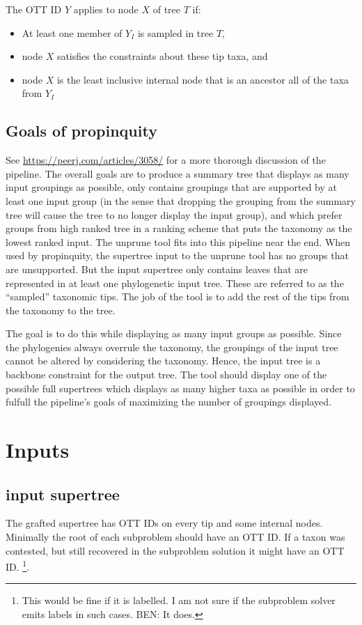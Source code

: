 \documentclass[english]{article}
\begin{document}
The OTT ID $Y$ applies to node $X$ of tree $T$ if:
\begin{itemize}
    \item At least one member of $Y_I$ is sampled in tree $T$,
    \item node $X$ satisfies the constraints about these tip taxa, and
    \item node $X$ is the least inclusive internal node that is an ancestor all of the taxa from $Y_I$
\end{itemize}

\subsection{Goals of propinquity}
See \url{https://peerj.com/articles/3058/} for a more thorough discussion of the pipeline.
The overall goals are to produce a summary tree that displays as many input groupings as
    possible, only contains groupings that are supported by at least one
    input group (in the sense that dropping the grouping from the summary tree will cause
    the tree to no longer display the input group), and which prefer groups from 
    high ranked tree in a ranking scheme that puts the taxonomy as the lowest ranked
    input.
The unprune tool fits into this pipeline near the end.
When used by propinquity, the supertree input to the unprune tool has no
    groups that are unsupported.
But the input supertree only contains leaves that are represented in at least one 
    phylogenetic input tree.
These are referred to as the ``sampled'' taxonomic tips.
The job of the tool is to add the rest of the tips from the taxonomy to the tree.

The goal is to do this while displaying as many input groups as possible.
Since the phylogenies always overrule the taxonomy, the groupings of the input
    tree cannot be altered by considering the taxonomy.
Hence, the input tree is a backbone constraint for the output tree.
The tool should display one of the possible full supertrees which displays as
    many higher taxa as possible in order to fulfull the pipeline's goals of
    maximizing the number of groupings displayed.




\section{Inputs}
\subsection{input supertree}
The grafted supertree has OTT IDs on every tip and some internal nodes.
Minimally the root of each subproblem should have an OTT ID.
If a taxon was contested, but still recovered in the subproblem solution it might
have an OTT ID.  \footnote{This would be fine if it is labelled. I am not sure
if the subproblem solver emits labels in such cases. BEN: It does.}.
\end{document}
